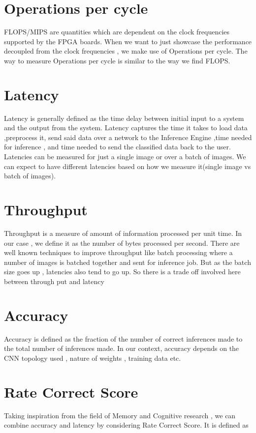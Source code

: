 \documentclass[titlepage]{report}
\begin{document}
\begin{itemize}
\section{Operations per cycle}
FLOPS/MIPS are quantities which are dependent on the clock frequencies supported by the FPGA boards.
When we want to just showcase the performance decoupled from the clock frequencies , we make use of Operations per cycle.
The way to measure Operations per cycle is similar to the way we find FLOPS. 

\section{Latency}
Latency is generally defined as the time delay between initial input to a system and the output from the system.
Latency captures the time it takes to load  data ,preprocess it, send said data over a network to the Inference Engine ,time needed for inference , and time needed to send the classified data back to the user.
Latencies can be measured for just a single image or over a batch of images. We can expect to have different latencies based on how we measure it(single image vs batch of images).

\section{Throughput}
Throughput is  a measure of amount of information processed per unit time. In our case , we define it as the number of bytes processed per second.
There are well known techniques to improve throughput like batch processing where a number of images is batched together and sent for inference job.
But as the batch size goes up , latencies also tend to go up. So there is a trade off involved here between through put and latency

\section{Accuracy}
Accuracy is defined as the fraction of the number of correct inferences made to the total number of inferences made.
In our context, accuracy depends on the CNN topology used , nature of weights , training data etc.


\section{Rate Correct Score}
Taking inspiration from the field of Memory and  Cognitive research , we can combine accuracy and latency by considering Rate Correct Score. It is defined as    


\end{itemize}
\end{document}
